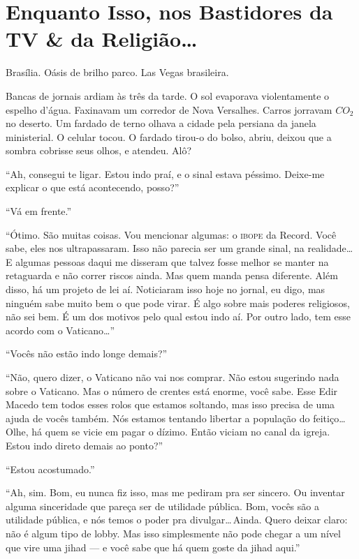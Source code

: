 \chapter{Enquanto Isso, nos Bastidores da TV \& da Religião\ldots}

Brasília. Oásis de brilho parco. Las Vegas brasileira.

Bancas de jornais ardiam às três da tarde. O sol evaporava violentamente o espelho d’água. Faxinavam um corredor de Nova Versalhes. Carros jorravam $CO_{2}$ no deserto. Um fardado de terno olhava a cidade pela persiana da janela ministerial. O celular tocou. O fardado tirou-o do bolso, abriu, deixou que a sombra cobrisse seus olhos, e atendeu. Alô?

``Ah, consegui te ligar. Estou indo praí, e o sinal estava péssimo. Deixe-me explicar o que está acontecendo, posso?''

``Vá em frente.''

``Ótimo. São muitas coisas. Vou mencionar algumas: o \textsc{ibope} da Record. Você sabe, eles nos ultrapassaram. Isso não parecia ser um grande sinal, na realidade\ldots\,E algumas pessoas daqui me disseram que talvez fosse melhor se manter na retaguarda e não correr riscos ainda. Mas quem manda pensa diferente. Além disso, há um projeto de lei aí. Noticiaram isso hoje no jornal, eu digo, mas ninguém sabe muito bem o que pode virar. É algo sobre mais poderes religiosos, não sei bem. É um dos motivos pelo qual estou indo aí. Por outro lado, tem esse acordo com o Vaticano\ldots''

``Vocês não estão indo longe demais?''

``Não, quero dizer, o Vaticano não vai nos comprar. Não estou sugerindo nada sobre o Vaticano. Mas o número de crentes está enorme, você sabe. Esse Edir Macedo tem todos esses rolos que estamos soltando, mas isso precisa de uma ajuda de vocês também. Nós estamos tentando libertar a população do feitiço\ldots\,Olhe, há quem se vicie em pagar o dízimo. Então viciam no canal da igreja. Estou indo direto demais ao ponto?''

``Estou acostumado.''

``Ah, sim. Bom, eu nunca fiz isso, mas me pediram pra ser sincero. Ou inventar alguma sinceridade que pareça ser de utilidade pública. Bom, vocês são a utilidade pública, e nós temos o poder pra divulgar\ldots\,Ainda. Quero deixar claro: não é algum tipo de lobby. Mas isso simplesmente não pode chegar a um nível que vire uma jihad --- e você sabe que há quem goste da jihad aqui.''

